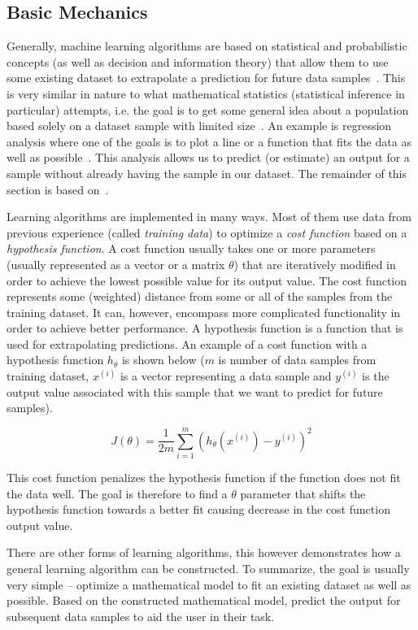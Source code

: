\subsection{Basic Mechanics}

Generally, machine learning algorithms are based on statistical and probabilistic concepts (as well as decision and information theory) that allow them to use some existing dataset to extrapolate a prediction for future data samples~\cite{bishop2006pattern}. This is very similar in nature to what mathematical statistics (statistical inference in particular) attempts, i.e. the goal is to get some general idea about a population based solely on a dataset sample with limited size~\cite{upton2014dictionary}. An example is regression analysis where one of the goals is to plot a line or a function that fits the data as well as possible~\cite{fox1997applied}. This analysis allows us to predict (or estimate) an output for a sample without already having the sample in our dataset. The remainder of this section is based on~\cite{mitchell1997machine}.

Learning algorithms are implemented in many ways. Most of them use data from previous experience (called \textit{training data}) to optimize a \textit{cost function} based on a \textit{hypothesis function}. A cost function usually takes one or more parameters (usually represented as a vector or a matrix $\theta$) that are iteratively modified in order to achieve the lowest possible value for its output value. The cost function represents some (weighted) distance from some or all of the samples from the training dataset. It can, however, encompass more complicated functionality in order to achieve better performance. A hypothesis function is a function that is used for extrapolating predictions. An example of a cost function with a hypothesis function $h_\theta$ is shown below ($m$ is number of data samples from training dataset, $x^{(i)}$ is a vector representing a data sample and $y^{(i)}$ is the output value associated with this sample that we want to predict for future samples).

$$J(\theta) = \frac{1}{2m}\sum_{i=1}^m(h_\theta(x^{(i)}) - y^{(i)})^2$$

This cost function penalizes the hypothesis function if the function does not fit the data well. The goal is therefore to find a $\theta$ parameter that shifts the hypothesis function towards a better fit causing decrease in the cost function output value.

There are other forms of learning algorithms, this however demonstrates how a general learning algorithm can be constructed. To summarize, the goal is usually very simple -- optimize a mathematical model to fit an existing dataset as well as possible. Based on the constructed mathematical model, predict the output for subsequent data samples to aid the user in their task.

